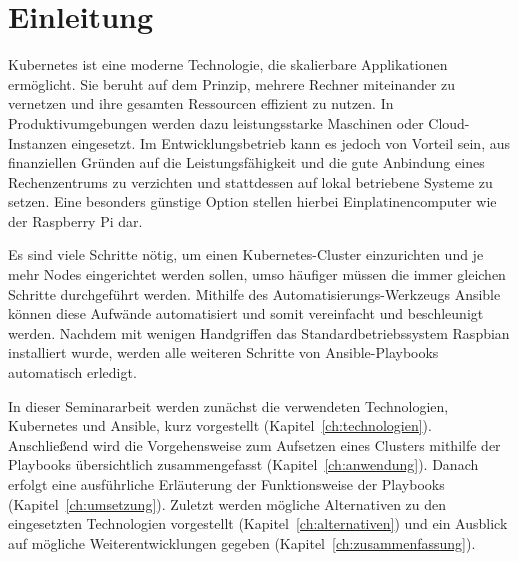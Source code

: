 \chapter{Einleitung}\label{ch:einleitung}

Kubernetes ist eine moderne Technologie, die skalierbare Applikationen ermöglicht.
Sie beruht auf dem Prinzip, mehrere Rechner miteinander zu vernetzen und ihre gesamten Ressourcen effizient zu nutzen.
In Produktivumgebungen werden dazu leistungsstarke Maschinen oder Cloud-Instanzen eingesetzt.
Im Entwicklungsbetrieb kann es jedoch von Vorteil sein, aus finanziellen Gründen auf die Leistungsfähigkeit und die gute Anbindung eines Rechenzentrums zu verzichten und stattdessen auf lokal betriebene Systeme zu setzen.
Eine besonders günstige Option stellen hierbei Einplatinencomputer wie der Raspberry Pi dar.

Es sind viele Schritte nötig, um einen Kubernetes-Cluster einzurichten und je mehr Nodes eingerichtet werden sollen, umso häufiger müssen die immer gleichen Schritte durchgeführt werden.
Mithilfe des Automatisierungs-Werkzeugs Ansible können diese Aufwände automatisiert und somit vereinfacht und beschleunigt werden.
Nachdem mit wenigen Handgriffen das Standardbetriebssystem Raspbian installiert wurde, werden alle weiteren Schritte von Ansible-Playbooks automatisch erledigt.

In dieser Seminararbeit werden zunächst die verwendeten Technologien, Kubernetes und Ansible, kurz vorgestellt (Kapitel~\ref{ch:technologien}).
Anschließend wird die Vorgehensweise zum Aufsetzen eines Clusters mithilfe der Playbooks übersichtlich zusammengefasst (Kapitel~\ref{ch:anwendung}).
Danach erfolgt eine ausführliche Erläuterung der Funktionsweise der Playbooks (Kapitel~\ref{ch:umsetzung}).
Zuletzt werden mögliche Alternativen zu den eingesetzten Technologien vorgestellt (Kapitel~\ref{ch:alternativen}) und ein Ausblick auf mögliche Weiterentwicklungen gegeben (Kapitel~\ref{ch:zusammenfassung}).